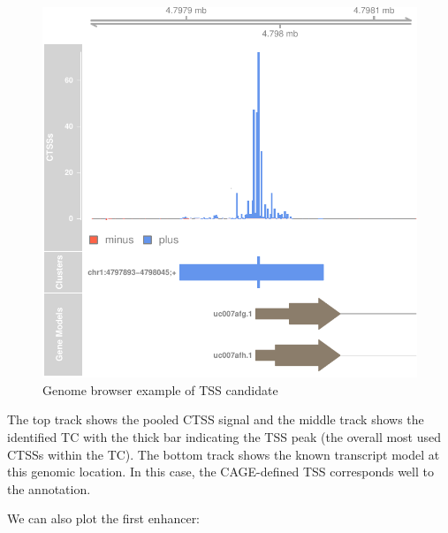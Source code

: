 \documentclass[9pt,a4paper,]{extarticle}
\newenvironment{Shaded}{\begin{snugshade}}{\end{snugshade}}
\newcommand{\KeywordTok}[1]{\textcolor[rgb]{0.13,0.29,0.53}{\textbf{{#1}}}}
\newcommand{\DataTypeTok}[1]{\textcolor[rgb]{0.13,0.29,0.53}{{#1}}}
\newcommand{\DecValTok}[1]{\textcolor[rgb]{0.00,0.00,0.81}{{#1}}}
\newcommand{\StringTok}[1]{\textcolor[rgb]{0.31,0.60,0.02}{{#1}}}
\newcommand{\CommentTok}[1]{\textcolor[rgb]{0.56,0.35,0.01}{\textit{{#1}}}}
\newcommand{\NormalTok}[1]{{#1}}
\begin{document}
\begin{figure}

{\centering \includegraphics{CAGEWorkflow_files/figure-latex/simpleTSS-1} 

}

\caption{Genome browser example of TSS candidate}\label{fig:simpleTSS}
\end{figure}

The top track shows the pooled CTSS signal and the middle track shows the identified TC with the thick bar indicating the TSS peak (the overall most used CTSSs within the TC). The bottom track shows the known transcript model at this genomic location. In this case, the CAGE-defined TSS corresponds well to the annotation.

We can also plot the first enhancer:

\begin{Shaded}
\end{Shaded}
\end{document}
